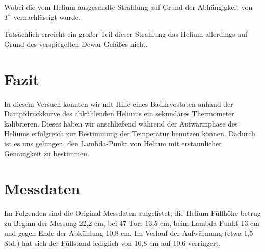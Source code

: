 \documentclass[bigchapter,colorback,accentcolor=tud4b,linedtoc,11pt]{tudreport}
\begin{document}
Wobei die vom Helium ausgesandte Strahlung auf Grund der Abhängigkeit von $T^4$
vernachlässigt wurde.

Tatsächlich erreicht ein großer Teil dieser Strahlung das Helium allerdings auf
Grund des verspiegelten Dewar-Gefäßes nicht.

\chapter{Fazit}
In diesem Versuch konnten wir mit Hilfe eines Badkryostaten anhand der
Dampfdruckkurve des abkühlenden Heliums ein sekundäres Thermometer kalibrieren. Dieses haben
wir anschließend während der Aufwärmphase des Heliums erfolgreich zur Bestimmung
der Temperatur benutzen können. Dadurch ist es uns gelungen, den
Lambda-Punkt von Helium mit erstaunlicher Genauigkeit zu bestimmen.

\chapter{Messdaten}

Im Folgenden sind die Original-Messdaten aufgelistet; die Helium-Füllhöhe betrug zu Beginn der Messung 22,2 cm, bei 47 Torr 13,5 cm, beim Lambda-Punkt 13 cm und gegen Ende der Abkühlung 10,8 cm. Im Verlauf der Aufwärmung (etwa 1,5 Std.) hat sich der Füllstand lediglich von 10,8 cm auf 10,6 verringert.
\end{document}
